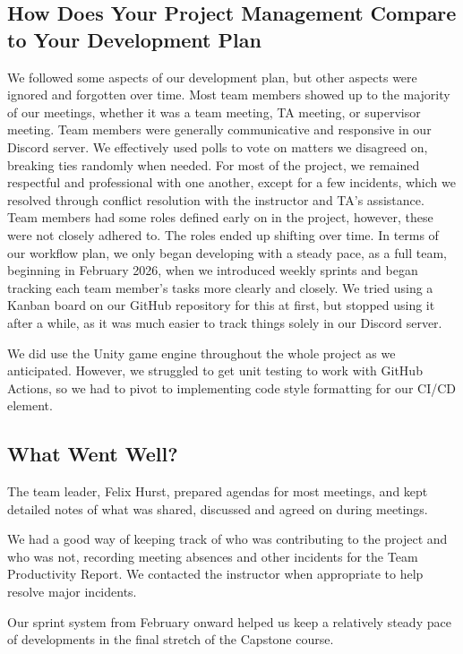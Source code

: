 \documentclass{article}
\begin{document}
\subsection{How Does Your Project Management Compare to Your Development Plan}

We followed some aspects of our development plan, but other aspects were ignored 
and forgotten over time. Most team members showed up to the majority of our 
meetings, whether it was a team meeting, TA meeting, or supervisor meeting.
Team members were generally communicative and responsive in our Discord server.
We effectively used polls to vote on matters we disagreed on, breaking ties 
randomly when needed. For most of the project, we remained respectful and 
professional with one another, except for a few incidents, which we resolved
through conflict resolution with the instructor and TA's assistance.
Team members had some roles defined early on in the project, however, these 
were not closely adhered to. The roles ended up shifting over time. In terms of 
our workflow plan, we only began developing with a steady pace, as a full team, 
beginning in February 2026, when we introduced weekly sprints and began 
tracking each team member's tasks more clearly and closely. We tried using a 
Kanban board on our GitHub repository for this at first, but stopped using it 
after a while, as it was much easier to track things solely in our Discord server.

We did use the Unity game engine throughout the whole project as we anticipated.
However, we struggled to get unit testing to work with GitHub Actions, so we had 
to pivot to implementing code style formatting for our CI/CD element.

\subsection{What Went Well?}

The team leader, Felix Hurst, prepared agendas for most meetings, and kept 
detailed notes of what was shared, discussed and agreed on during meetings.

We had a good way of keeping track of who was contributing to the project 
and who was not, recording meeting absences and other incidents for the 
Team Productivity Report. We contacted the instructor when appropriate to 
help resolve major incidents.

Our sprint system from February onward helped us keep a relatively steady 
pace of developments in the final stretch of the Capstone course.
\end{document}
